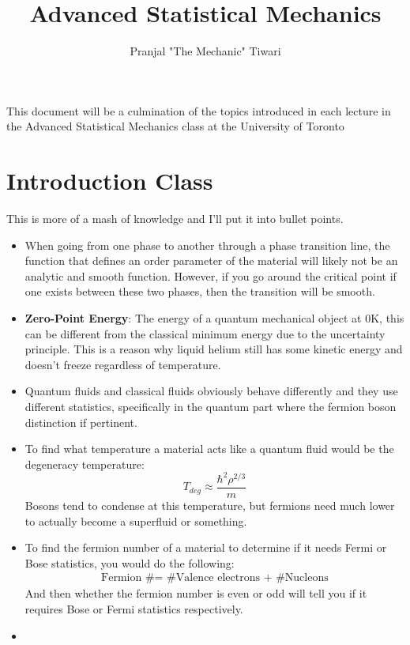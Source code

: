 \documentclass[11pt,onecolumn]{article}
\title{Advanced Statistical Mechanics}
\author{Pranjal "The Mechanic" Tiwari}
\begin{document}
\maketitle

This document will be a culmination of the topics introduced in each lecture in the Advanced Statistical Mechanics class at the University of Toronto

\section{Introduction Class}

This is more of a mash of knowledge and I'll put it into bullet points.

\begin{itemize}
	\item When going from one phase to another through a phase transition line, the function that defines an order parameter of the material will likely not be an analytic and smooth function. However, if you go around the critical point if one exists between these two phases, then the transition will be smooth.
	\item \textbf{Zero-Point Energy}: The energy of a quantum mechanical object at 0K, this can be different from the classical minimum energy due to the uncertainty principle. This is a reason why liquid helium still has some kinetic energy and doesn't freeze regardless of temperature.
	\item Quantum fluids and classical fluids obviously behave differently and they use different statistics, specifically in the quantum part where the fermion boson distinction if pertinent.
	\item To find what temperature a material acts like a quantum fluid would be the degeneracy temperature:
	\begin{equation*}
	T_{deg}\approx\frac{\hbar^2\rho^{2/3}}{m}
	\end{equation*}
	Bosons tend to condense at this temperature, but fermions need much lower to actually become a superfluid or something.
	\item To find the fermion number of a material to determine if it needs Fermi or Bose statistics, you would do the following:
	\begin{align*}
	\text{Fermion \# = \# Valence electrons + \# Nucleons}
	\end{align*}
	And then whether the fermion number is even or odd will tell you if it requires Bose or Fermi statistics respectively.
	\item
\end{itemize}
\end{document}
